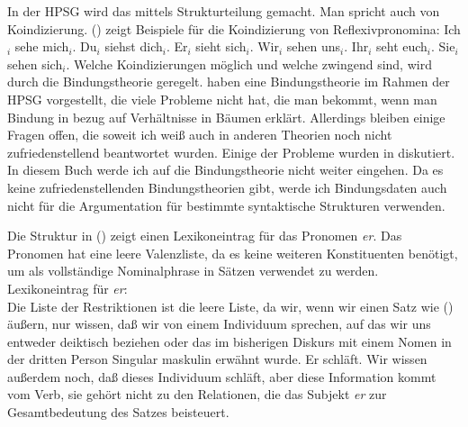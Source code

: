In der HPSG wird das mittels Strukturteilung gemacht. Man spricht auch von Koindizierung.
() zeigt Beispiele für die Koindizierung von Reflexivpronomina:
\eal
\ex Ich$_i$ sehe mich$_i$.
\ex Du$_i$ siehst dich$_i$.
\ex Er$_i$ sieht sich$_i$.
\ex Wir$_i$ sehen uns$_i$.
\ex Ihr$_i$ seht euch$_i$.
\ex Sie$_i$ sehen sich$_i$.
\zl
Welche Koindizierungen möglich und welche zwingend sind, wird durch die Bindungstheorie
geregelt. \citet{PS92a,ps2} haben eine Bindungstheorie im Rahmen der HPSG vorgestellt, die viele Probleme
nicht hat, die man bekommt, wenn man Bindung in bezug auf Verhältnisse in Bäumen erklärt. Allerdings bleiben
einige Fragen offen, die soweit ich weiß auch in anderen Theorien noch nicht zufriedenstellend beantwortet
wurden. Einige der Probleme wurden in  diskutiert. In diesem Buch werde
ich auf die Bindungstheorie nicht weiter eingehen. Da es keine zufriedenstellenden Bindungstheorien gibt,
werde ich Bindungsdaten auch nicht für die Argumentation für bestimmte syntaktische Strukturen verwenden.

Die Struktur in () zeigt einen Lexikoneintrag für das Pronomen \emph{er}. Das Pronomen hat eine
leere Valenzliste, da es keine weiteren Konstituenten benötigt, um als vollständige Nominalphrase in Sätzen
verwendet zu werden.
\ea
Lexikoneintrag für \emph{er}:\\
\z
Die Liste der Restriktionen ist die leere Liste, da wir, wenn wir einen Satz wie () äußern, nur
wissen, daß wir von einem Individuum sprechen, auf das wir uns entweder deiktisch beziehen oder das
im bisherigen Diskurs mit einem Nomen in der dritten Person Singular maskulin erwähnt wurde.
\ea
Er schläft.
\z
Wir wissen außerdem noch, daß dieses Individuum schläft, aber diese Information kommt vom Verb, sie
gehört nicht zu den Relationen, die das Subjekt \emph{er} zur Gesamtbedeutung des Satzes beisteuert.

